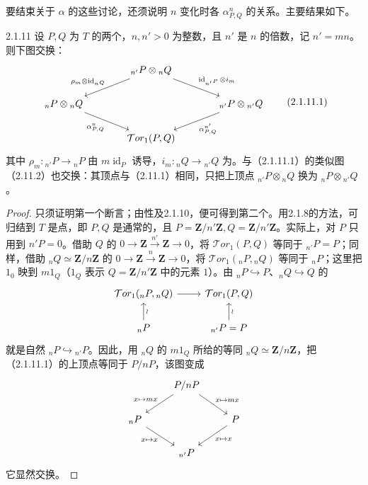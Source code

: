 要结束关于 $\alpha$ 的这些讨论，还须说明 $n$ 变化时各 $\alpha^n_{P,Q}$ 的关系。主要结果如下。
\begin{SGAresult}{}{2.1.11}
设 $P,Q$ 为 $T$ 的两个，$n,n'>0$ 为整数，且 $n'$ 是 $n$ 的倍数，记 $n'=mn$。则下图交换：
\[\begin{tikzcd}[column sep=large]
&{}_{n'}P\otimes{}_nQ\arrow[dl,"\rho_m\otimes\operatorname{id}_{{}_nQ}"']\arrow[dr,"\operatorname{id}_{{}_{n'}P}\otimes i_m"]&\\
{}_nP\otimes{}_nQ\arrow[dr,"{\alpha^n_{P,Q}}"']&&{}_{n'}P\otimes{}_{n'}Q\arrow[dl,"{\alpha^{n'}_{P,Q}}"]\\
&\mathcal Tor_1(P,Q)&
\end{tikzcd}\tag{2.1.11.1}\]
其中 $\rho_m:{}_{n'}P\longrightarrow{}_nP$ 由 $m\operatorname{id}_P$ 诱导，$i_m:{}_nQ\longrightarrow{}_{n'}Q$ 为。与（2.1.11.1）的类似图（2.11.2）也交换：其顶点与（2.11.1）相同，只把上顶点 ${}_{n'}P\otimes{}_nQ$ 换为 ${}_nP\otimes{}_{n'}Q$。
\end{SGAresult}
\begin{proof}
只须证明第一个断言；由性及2.1.10，便可得到第二个。用2.1.8的方法，可归结到 $T$ 是点，即 $P,Q$ 是通常的，且 $P=\mathbf Z/n'\mathbf Z,Q=\mathbf Z/n'\mathbf Z$。实际上，对 $P$ 只用到 $n'P=0$。借助 $Q$ 的 $0\longrightarrow\mathbf Z\xrightarrow{n'}\mathbf Z\longrightarrow0$，将 $\mathcal Tor_1(P,Q)$ 等同于 ${}_{n'}P=P$；同样，借助 ${}_nQ\simeq\mathbf Z/n\mathbf Z$ 的 $0\longrightarrow\mathbf Z\xrightarrow n\mathbf Z\longrightarrow0$，将 $\mathcal Tor_1({}_nP,{}_nQ)$ 等同于 ${}_nP$；这里把 $1_0$ 映到 $m1_Q$（$1_Q$ 表示 $Q=\mathbf Z/n'\mathbf Z$ 中的元素 $1$）。由 ${}_nP\hookrightarrow P$、${}_nQ\hookrightarrow Q$ 的
\[\begin{tikzcd}
\mathcal Tor_1({}_nP,{}_nQ)\arrow[r]&\mathcal Tor_1(P,Q)\\
{}_nP\arrow[u,"\wr"']&{}_{n'}P=P\arrow[u,"\wr"']
\end{tikzcd}\]
就是自然 ${}_nP\hookrightarrow{}_{n'}P$。因此，用 ${}_nQ$ 的 $m1_Q$ 所给的等同 ${}_nQ\simeq\mathbf Z/n\mathbf Z$，把（2.1.11.1）的上顶点等同于 $P/nP$，该图变成
\[\begin{tikzcd}
&P/nP\arrow[dl,"{x\mapsto mx}"']\arrow[dr,"{x\mapsto mx}"]&\\
{}_nP\arrow[dr,"{x\mapsto x}"']&&P\arrow[dl,"{x\mapsto x}"]\\
&{}_{n'}P&
\end{tikzcd}\]
它显然交换。
\end{proof}
